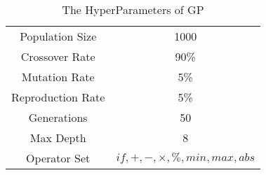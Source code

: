 \begin{table}
    \caption{The HyperParameters of GP}
    \begin{tabular}{|c|c|}
        \hline 
        Population Size & 1000 \\
        Crossover Rate & 90\% \\
        Mutation Rate & 5\% \\
        Reproduction Rate & 5\% \\
        Generations & 50 \\
        Max Depth & 8 \\
        Operator Set & $if,+,-,\times,\%,min,max,abs$ \\    
    \end{tabular}
\end{table}